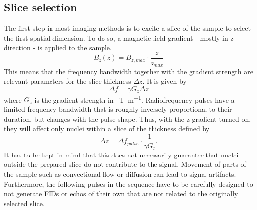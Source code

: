         \subsection{Slice selection}
        \label{sec:theory:sliceSelection}
            The first step in most imaging methods is to excite a slice of the sample to select the first spatial dimension. To do so, a magnetic field gradient - mostly in z direction - is applied to the sample. 
            \begin{equation}
                B_z(z) = B_{z,max} \cdot \frac{z}{z_{max}}
            \end{equation}
            This means that the frequency bandwidth together with the gradient strength are relevant parameters for the slice thickness $\Delta z$. It is given by 
            \begin{equation}
                \Delta f = \gamma G_z \Delta z
            \end{equation}
            where $G_z$ is the gradient strength in \SI{}{\tesla\per\meter}.
            Radiofrequency pulses have a limited frequency bandwidth that is roughly inversely proportional to their duration, but changes with the pulse shape. Thus, with the z-gradient turned on, they will affect only nuclei within a slice of the thickness defined by
            \begin{equation}
                \Delta z = \Delta f_{pulse} \cdot \frac{1}{\gamma G_z}.
            \end{equation}
             It has to be kept in mind that this does not necessarily guarantee that nuclei outside the prepared slice do not contribute to the signal. Movement of parts of the sample such as convectional flow or diffusion can lead to signal artifacts. Furthermore, the following pulses in the sequence have to be carefully designed to not generate FIDs or echos of their own that are not related to the originally selected slice.

